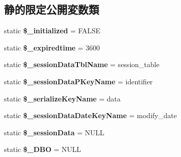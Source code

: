 \subsection*{静的限定公開変数類}
\begin{DoxyCompactItemize}
\item 
\hypertarget{class_session_data_d_b_a198c6370f10af8501e23e063647a900e}{}static {\bfseries \$\+\_\+initialized} = F\+A\+L\+S\+E\label{class_session_data_d_b_a198c6370f10af8501e23e063647a900e}

\item 
\hypertarget{class_session_data_d_b_a481c0a95033cdb87358a864b12f03ec5}{}static {\bfseries \$\+\_\+expiredtime} = 3600\label{class_session_data_d_b_a481c0a95033cdb87358a864b12f03ec5}

\item 
\hypertarget{class_session_data_d_b_a63ba0b8b390947552d288104fde0f1d9}{}static {\bfseries \$\+\_\+session\+Data\+Tbl\+Name} = \textquotesingle{}session\+\_\+table\textquotesingle{}\label{class_session_data_d_b_a63ba0b8b390947552d288104fde0f1d9}

\item 
\hypertarget{class_session_data_d_b_a0d32fa71ed3feb51841a22e8807aa4da}{}static {\bfseries \$\+\_\+session\+Data\+P\+Key\+Name} = \textquotesingle{}identifier\textquotesingle{}\label{class_session_data_d_b_a0d32fa71ed3feb51841a22e8807aa4da}

\item 
\hypertarget{class_session_data_d_b_adb7138e161a094c8fca2bbd626610631}{}static {\bfseries \$\+\_\+serialize\+Key\+Name} = \textquotesingle{}data\textquotesingle{}\label{class_session_data_d_b_adb7138e161a094c8fca2bbd626610631}

\item 
\hypertarget{class_session_data_d_b_ac6c46779036540efb3c7f555ae8c1cdd}{}static {\bfseries \$\+\_\+session\+Data\+Date\+Key\+Name} = \textquotesingle{}modify\+\_\+date\textquotesingle{}\label{class_session_data_d_b_ac6c46779036540efb3c7f555ae8c1cdd}

\item 
\hypertarget{class_session_data_d_b_acf9b69ea99842849f94106bcb49b4f0e}{}static {\bfseries \$\+\_\+session\+Data} = N\+U\+L\+L\label{class_session_data_d_b_acf9b69ea99842849f94106bcb49b4f0e}

\item 
\hypertarget{class_session_data_d_b_acee92134b572b463c0d46eb38df2586e}{}static {\bfseries \$\+\_\+\+D\+B\+O} = N\+U\+L\+L\label{class_session_data_d_b_acee92134b572b463c0d46eb38df2586e}

\end{DoxyCompactItemize}


